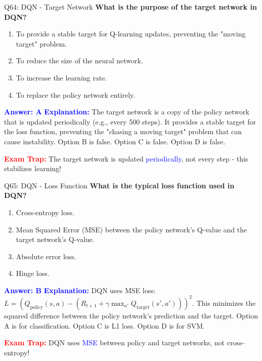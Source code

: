 \documentclass[8pt]{beamer}
\begin{document}
	\begin{frame}{Q64: DQN - Target Network}
		\fontsize{6.5}{7.5}\selectfont
		\textbf{What is the purpose of the target network in DQN?}
		
		\begin{enumerate}
			\item To provide a stable target for Q-learning updates, preventing the "moving target" problem.
			\item To reduce the size of the neural network.
			\item To increase the learning rate.
			\item To replace the policy network entirely.
		\end{enumerate}
		
		\vspace{0.1cm}
		\textcolor{blue}{\textbf{Answer: A}}
		\vspace{0.1cm}
		\textcolor{blue}{\textbf{Explanation:}} The target network is a copy of the policy network that is updated periodically (e.g., every 500 steps). It provides a stable target for the loss function, preventing the "chasing a moving target" problem that can cause instability. Option B is false. Option C is false. Option D is false.
		
		\textcolor{red}{\textbf{Exam Trap:}} The target network is updated \textcolor{blue}{periodically}, not every step - this stabilizes learning!
	\end{frame}
	
	\begin{frame}{Q65: DQN - Loss Function}
		\fontsize{6.5}{7.5}\selectfont
		\textbf{What is the typical loss function used in DQN?}
		
		\begin{enumerate}
			\item Cross-entropy loss.
			\item Mean Squared Error (MSE) between the policy network's Q-value and the target network's Q-value.
			\item Absolute error loss.
			\item Hinge loss.
		\end{enumerate}
		
		\vspace{0.1cm}
		\textcolor{blue}{\textbf{Answer: B}}
		\vspace{0.1cm}
		\textcolor{blue}{\textbf{Explanation:}} DQN uses MSE loss: $L = (Q_{\text{policy}}(s,a) - (R_{t+1} + \gamma \max_{a'} Q_{\text{target}}(s',a')))^2$. This minimizes the squared difference between the policy network's prediction and the target. Option A is for classification. Option C is L1 loss. Option D is for SVM.
		
		\textcolor{red}{\textbf{Exam Trap:}} DQN uses \textcolor{blue}{MSE} between policy and target networks, not cross-entropy!
	\end{frame}
	
\end{document}
